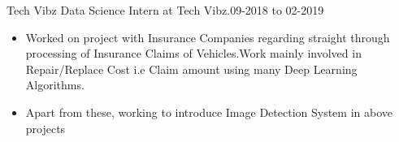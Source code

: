 %
%
%

\renewcommand{\baselinestretch}{1.4}
\begin{experiences}
  \experience
    {Tech Vibz}   {Data Science Intern at Tech Vibz.09-2018 to 02-2019}{}{}
    {} {
                      \begin{itemize}
                        \item Worked on project with Insurance Companies regarding straight through
processing of Insurance Claims of Vehicles.Work mainly involved in  Repair/Replace Cost i.e Claim amount using many Deep Learning Algorithms.                       
                        \item Apart from these, working to introduce Image Detection System in above projects
                        
                        
                        
                        
                      \end{itemize}
                    }


\end{experiences}
%
%
%

